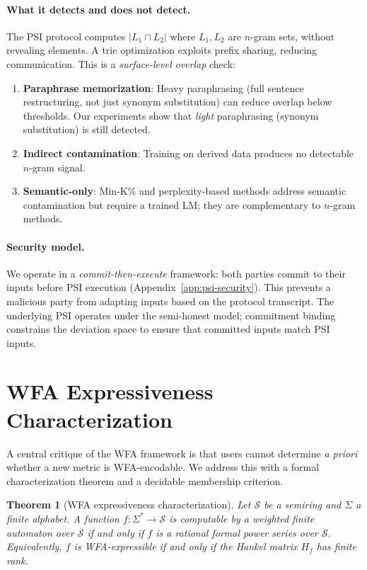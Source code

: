\documentclass[11pt]{article}
\newtheorem{theorem}{Theorem}[section]
\newcommand{\semiring}[1]{\mathcal{#1}}
\begin{document}
\paragraph{What it detects and does not detect.}
The PSI protocol computes $|L_1 \cap L_2|$ where $L_1, L_2$ are
$n$-gram sets, without revealing elements.  A trie optimization
exploits prefix sharing, reducing communication.
This is a \emph{surface-level overlap} check:
\begin{enumerate}[nosep]
\item \textbf{Paraphrase memorization}: Heavy paraphrasing (full
  sentence restructuring, not just synonym substitution) can
  reduce overlap below thresholds.  Our experiments show that
  \emph{light} paraphrasing (synonym substitution) is still detected.
\item \textbf{Indirect contamination}: Training on derived data
  produces no detectable $n$-gram signal.
\item \textbf{Semantic-only}: Min-K\% and perplexity-based methods
  address semantic contamination but require a trained LM;
  they are complementary to $n$-gram methods.
\end{enumerate}

\paragraph{Security model.}
We operate in a \emph{commit-then-execute} framework: both parties
commit to their inputs before PSI execution
(Appendix~\ref{app:psi-security}).  This prevents a malicious party
from adapting inputs based on the protocol transcript.  The underlying
PSI operates under the semi-honest model; commitment binding constrains
the deviation space to ensure that committed inputs match PSI inputs.


\section{WFA Expressiveness Characterization}\label{sec:expressiveness}

A central critique of the WFA framework is that users cannot determine
\emph{a priori} whether a new metric is WFA-encodable.  We address this
with a formal characterization theorem and a decidable membership criterion.

\begin{theorem}[WFA expressiveness characterization]\label{thm:expressiveness}
Let $\semiring{S}$ be a semiring and $\Sigma$ a finite alphabet.
A function $f : \Sigma^* \to \semiring{S}$ is computable by a weighted
finite automaton over $\semiring{S}$ if and only if $f$ is a rational
formal power series over $\semiring{S}$.  Equivalently, $f$ is
WFA-expressible if and only if the Hankel matrix $H_f$ has finite rank.
\end{theorem}
\end{document}
